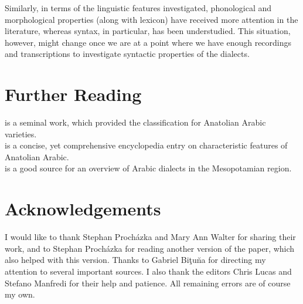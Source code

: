 \documentclass[output=paper]{langsci/langscibook}
\begin{document}
Similarly, in terms of the linguistic features investigated, phonological and morphological properties (along with lexicon) have received more attention in the literature, whereas syntax, in particular, has been understudied. This situation, however, might change once we are at a point where we have enough recordings and transcriptions to investigate syntactic properties of the dialects. 

\section*{Further Reading}
 
\citet{Jastrow1978} is a seminal work, which provided the classification for Anatolian Arabic varieties. \\
\citet{Jastrow2011anatolian} is a concise, yet comprehensive encyclopedia entry on characteristic features of Anatolian Arabic.\\
\noindent \citet{Talay2011} is a good source for an overview of Arabic dialects in the Meso\-potamian region.

\section*{Acknowledgements}
I would like to thank Stephan Proch\'{a}zka and Mary Ann Walter for sharing their work, and to Stephan Proch\'{a}zka for reading another version of the paper, which also helped with this version. Thanks to Gabriel Bi\c{t}u\u{n}a for directing my attention to several important sources. I also thank the editors Chris Lucas and Stefano Manfredi for their help and patience. All remaining errors are of course my own. 
\end{document}
